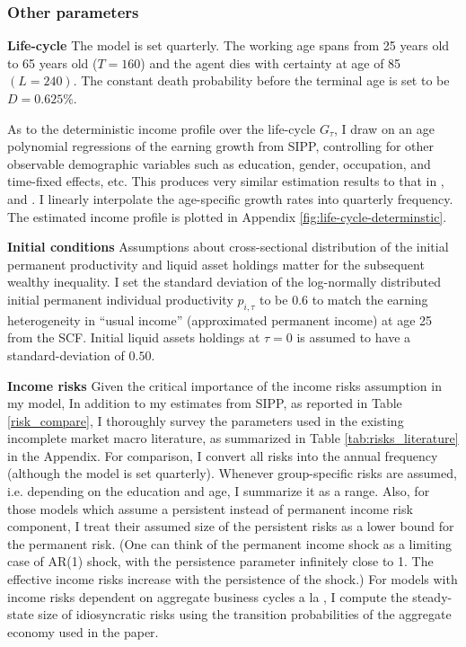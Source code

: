 \subsubsection{Other parameters}


\textbf{Life-cycle} The model is set quarterly. The working age spans from 25 years old to 65 years old ($T=160$) and the agent dies with certainty at age of 85 $(L=240)$. The constant death probability before the terminal age is set to be $D=0.625\%$. 


As to the deterministic income profile over the life-cycle $G_\tau$, I draw on an age polynomial regressions of the earning growth from SIPP, controlling
for other observable demographic variables such as education, gender, occupation, and time-fixed effects, etc. This produces very similar estimation results to that in \cite{gourinchas2002consumption}, \cite{cagetti2003wealth} and \cite{kaplan2014model}. I linearly interpolate the age-specific growth rates into quarterly frequency. The estimated income profile is plotted in Appendix \ref{fig:life-cycle-determinstic}. 

\textbf{Initial conditions} Assumptions about cross-sectional distribution of the initial permanent productivity and liquid asset holdings matter for the subsequent wealthy inequality. I set the standard deviation of the log-normally distributed initial permanent individual productivity $p_{i,\tau}$ to be $0.6$ to match the earning heterogeneity in ``usual income'' (approximated permanent income) at age 25 from the SCF. Initial liquid assets holdings at $\tau=0$ is assumed to have a standard-deviation of $0.50$. %

\textbf{Income risks} Given the critical importance of the income risks assumption in my model, In addition to my estimates from SIPP, as reported in Table \ref{risk_compare}, I thoroughly survey the parameters used in the existing incomplete market macro literature, as summarized in Table \ref{tab:risks_literature} in the Appendix. For comparison, I convert all risks into the annual frequency (although the model is set quarterly). Whenever group-specific risks are assumed, i.e. depending on the education and age, I summarize it as a range. Also, for those models which assume a persistent instead of permanent income risk component, I treat their assumed size of the persistent risks as a lower bound for the permanent risk. (One can think of the permanent income shock as a limiting case of AR(1) shock, with the persistence parameter infinitely close to 1. The effective income risks increase with the persistence of the shock.)  For models with income risks dependent on aggregate business cycles a la \cite{krusell1998income}, I compute the steady-state size of idiosyncratic risks using the transition probabilities of the aggregate economy used in the paper.  

